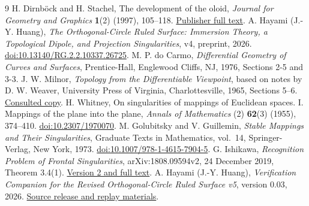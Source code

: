 \documentclass[11pt,a4paper]{article}
\theoremstyle{definition}\newtheorem{definition}[theorem]{Definition}
\theoremstyle{remark}\newtheorem{remark}[theorem]{Remark}
\begin{document}
\begin{thebibliography}{9}
 H. Dirnb\"ock and H. Stachel, The development of the oloid,
\emph{Journal for Geometry and Graphics} \textbf{1}(2) (1997), 105--118.
\href{https://www.heldermann-verlag.de/jgg/jgg01_05/jgg0113.pdf}{Publisher full text}.
 A. Hayami (J.-Y. Huang), \emph{The Orthogonal-Circle
Ruled Surface: Immersion Theory, a Topological Dipole, and Projection
Singularities}, v4, preprint, 2026.
\href{https://doi.org/10.13140/RG.2.2.10337.26725}{doi:10.13140/RG.2.2.10337.26725}.
 M. P. do Carmo, \emph{Differential Geometry of Curves
and Surfaces}, Prentice-Hall, Englewood Cliffs, NJ, 1976,
Sections 2-5 and 3-3.
 J. W. Milnor, \emph{Topology from the Differentiable
Viewpoint}, based on notes by D. W. Weaver, University Press of Virginia,
Charlottesville, 1965, Sections 5--6.
\href{https://people.dm.unipi.it/benedett/MILNOR-TDVPOINT.pdf}{Consulted copy}.
 H. Whitney, On singularities of mappings of Euclidean
spaces. I. Mappings of the plane into the plane, \emph{Annals of Mathematics}
(2) \textbf{62}(3) (1955), 374--410.
\href{https://doi.org/10.2307/1970070}{doi:10.2307/1970070}.
 M. Golubitsky and V. Guillemin, \emph{Stable Mappings and
Their Singularities}, Graduate Texts in Mathematics, vol.~14,
Springer-Verlag, New York, 1973.
\href{https://doi.org/10.1007/978-1-4615-7904-5}{doi:10.1007/978-1-4615-7904-5}.
 G. Ishikawa, \emph{Recognition Problem of Frontal
Singularities}, arXiv:1808.09594v2, 24 December 2019, Theorem 3.4(1).
\href{https://arxiv.org/abs/1808.09594v2}{Version 2 and full text}.
 A. Hayami (J.-Y. Huang), \emph{Verification Companion
for the Revised Orthogonal-Circle Ruled Surface v5}, version 0.03, 2026.
\href{https://github.com/Akari-H-111/hayami-mathematical-research/releases/tag/ruled-surface-v5-companion-v0.03}{Source release and replay materials}.
\end{thebibliography}
\end{document}
